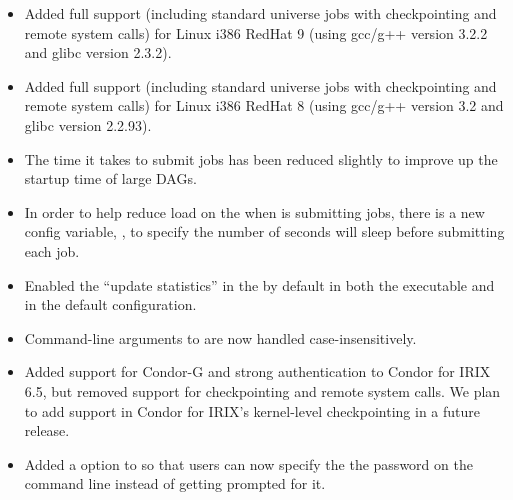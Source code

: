 \begin{itemize}

\item Added full support (including standard universe jobs with
  checkpointing and remote system calls) for Linux i386 RedHat 9
  (using gcc/g++ version 3.2.2 and glibc version 2.3.2). 

\item Added full support (including standard universe jobs with
  checkpointing and remote system calls) for Linux i386 RedHat 8
  (using gcc/g++ version 3.2 and glibc version 2.2.93). 

\item The time it takes  to submit jobs has been
      reduced slightly to improve up the startup time of large DAGs.

\item In order to help reduce load on the  when
       is submitting jobs, there is a new config
      variable, , to specify the number
      of seconds  will sleep before submitting each
      job.

\item Enabled the ``update statistics'' in the  by
      default in both the executable and in the default configuration.

\item Command-line arguments to  are now handled
      case-insensitively.


\item Added support for Condor-G and strong authentication to Condor
  for IRIX 6.5, but removed support for checkpointing and remote
  system calls.
  We plan to add support in Condor for IRIX's kernel-level
  checkpointing in a future release.

\item Added a  option to  so that users
can now specify the the password on the command line instead of getting
prompted for it.


\end{itemize}
